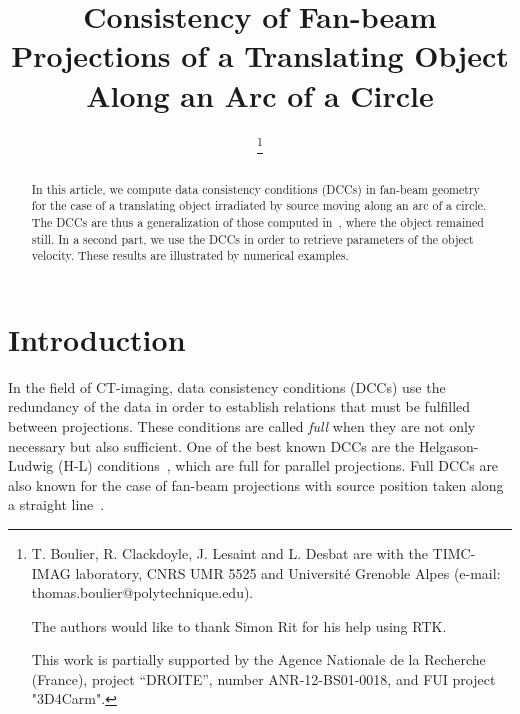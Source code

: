 \documentclass[twocolumn]{IEEEtran}
\title{Consistency of Fan-beam Projections of a Translating Object Along an Arc of a Circle}
\date{}
\begin{document}
\author{
	\thanks{T. Boulier, R. Clackdoyle, J. Lesaint and L. Desbat are with the TIMC-IMAG laboratory, CNRS UMR 5525 and Universit\'e Grenoble Alpes (e-mail: thomas.boulier@polytechnique.edu).

	The authors would like to thank Simon Rit for his help using RTK.
			
	This work is partially supported by the Agence Nationale de la Recherche (France), project ``DROITE'', number ANR-12-BS01-0018, and FUI project "3D4Carm".
}		
\IEEEauthorblockA{}
}

\maketitle

\begin{abstract}
In this article, we compute data consistency conditions
(DCCs) in fan-beam geometry for the case of a translating object irradiated by source moving along an arc of a circle. The DCCs are thus a generalization of those computed in~\cite{clackdoyle2015consistency}, where the object remained still. In a second part, we use the DCCs in order to retrieve parameters of the object velocity. These results are illustrated by numerical examples.
\end{abstract}

\section{Introduction}

In the field of CT-imaging, data consistency conditions (DCCs) use the redundancy of the data in order to establish relations that must be fulfilled  between projections. These conditions are called \emph{full} when they are not only necessary but also sufficient. One of the best known DCCs are the Helgason-Ludwig (H-L) conditions~\cite{helgason1980radon,ludwig1966radon}, which are full for parallel projections. Full DCCs are also known for the case of fan-beam projections with source position taken along a straight line~\cite{clackdoyle2013necessary}.
\end{document}
